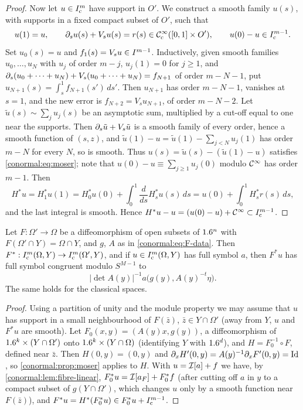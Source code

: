 \begin{proof}
  Now let $u\in I^{m}_{\mathrm c}$ have support in $O'$.  We construct a smooth
  family $u(s)$, with supports in a fixed compact subset of $O'$, such that
  \begin{equation}\label{conormal:eq:moser}
    u(1)=u,\qquad \partial_su(s)+V_su(s)=r(s)\in\mathcal{C}^\infty_{\mathrm{c}}([0,1]\times O'),\qquad
    u(0)-u\in I^{m-1}_{\mathrm c}.
  \end{equation}
  Set $u_0(s)=u$ and $f_1(s)=V_su\in I^{m-1}$.  Inductively, given smooth
  families $u_0,\dots,u_N$ with $u_j$ of order $m-j$, $u_j(1)=0$ for $j\ge1$,
  and $\partial_s(u_0+\dots+u_N)+V_s(u_0+\dots+u_N)=f_{N+1}$ of order $m-N-1$, put
  $u_{N+1}(s)=\int_s^1f_{N+1}(s')\,ds'$.  Then $u_{N+1}$ has order $m-N-1$,
  vanishes at $s=1$, and the new error is $f_{N+2}=V_su_{N+1}$, of order
  $m-N-2$.  Let $\tilde u(s)\sim\sum_ju_j(s)$ be an asymptotic sum, multiplied by a
  cut-off equal to one near the supports.  Then $\partial_s\tilde u+V_s\tilde u$ is a
  smooth family of every order, hence a smooth function of $(s,z)$, and
  $\tilde u(1)-u=\tilde u(1)-\sum_{j<N}u_j(1)$ has order $m-N$ for every $N$, so
  is smooth.  Thus $u(s)=\tilde u(s)-(\tilde u(1)-u)$ satisfies
  \eqref{conormal:eq:moser}; note that $u(0)-u\equiv\sum_{j\ge1}u_j(0)$ modulo
  $\mathcal{C}^\infty$ has order $m-1$.
  Then
  \begin{equation*}
    H^*u=H_1^*u(1)=H_0^*u(0)+\int_0^1\frac{d}{ds}H_s^*u(s)\,ds
    =u(0)+\int_0^1H_s^*r(s)\,ds,
  \end{equation*}
  and the last integral is smooth.  Hence
  $H^*u-u=(u(0)-u)+\mathcal{C}^\infty\subset I^{m-1}_{\mathrm c}$.
\end{proof}

\begin{theorem}\label{conormal:thm:invariance}
  Let $F:\Omega'\to\Omega$ be a diffeomorphism of open subsets of $1.6^n$ with
  $F(\Omega'\cap Y)=\Omega\cap Y$, and $g$, $A$ as in \eqref{conormal:eq:F-data}.
  Then $F^*:I^{m}_{\mathrm c}(\Omega,Y)\to I^{m}_{\mathrm c}(\Omega',Y)$, and if
  $u\in I^{m}_{\mathrm c}(\Omega,Y)$ has full symbol $a$, then $F^*u$ has full
  symbol congruent modulo $S^{M-1}$ to
  \begin{equation}\label{conormal:eq:symbol-transform}
    |\det A(y)|^{-1}a\big(g(y),A(y)^{-t}\eta\big).
  \end{equation}
  The same holds for the classical spaces.
\end{theorem}
\begin{proof}
  Using a partition of unity and the module property we may assume that $u$ has
  support in a small neighbourhood of $F(\bar z)$, $\bar z\in Y\cap\Omega'$ (away
  from $Y$, $u$ and $F^*u$ are smooth).  Let $F_0(x,y)=(A(y)x,g(y))$, a
  diffeomorphism of $1.6^k\times(Y\cap\Omega')$ onto $1.6^k\times(Y\cap\Omega)$
  (identifying $Y$ with $1.6^d$), and $H=F_0^{-1}\circ F$, defined near $\bar z$.
  Then $H(0,y)=(0,y)$ and $\partial_xH'(0,y)=A(y)^{-1}\partial_xF'(0,y)=\operatorname{Id}$, so
  \cref{conormal:prop:moser} applies to $H$.  With $u=\mathcal{I}[a]+f$ we have, by
  \cref{conormal:lem:fibre-linear}, $F_0^*u=\mathcal{I}[a_F]+F_0^*f$ (after cutting
  off $a$ in $y$ to a compact subset of $g(Y\cap\Omega')$, which changes $u$
  only by a smooth function near $F(\bar z)$), and $F^*u=H^*(F_0^*u)\in F_0^*u+I^{m-1}_{\mathrm c}$.
\end{proof}

